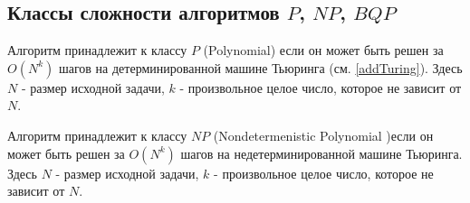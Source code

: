 \subsection{Классы сложности алгоритмов $P$, $NP$, $BQP$ }

\begin{definition}
Алгоритм принадлежит к классу $P$ (Polynomial) если он может быть решен за
 $O\left(N^k\right)$ шагов на детерминированной машине Тьюринга
(см. \ref{addTuring}).  Здесь $N$ - размер исходной задачи, $k$ -
произвольное целое число, которое не зависит от $N$. 
\end{definition}

\begin{definition}
Алгоритм принадлежит к классу $NP$ (Nondetermenistic Polynomial )если
он может быть решен за  $O\left(N^k\right)$ шагов на
недетерминированной машине Тьюринга.  Здесь $N$ - размер исходной
задачи, $k$ - произвольное целое число, которое не зависит от $N$. 
\end{definition}

